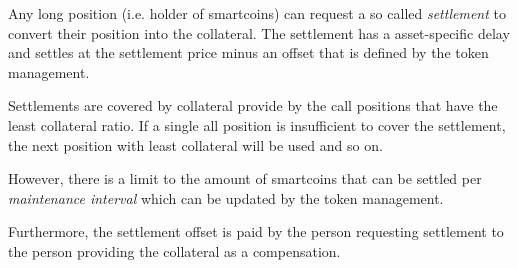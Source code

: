 \label{sec:settlement}

Any long position (i.e. holder of smartcoins) can request a so called
\emph{settlement} to convert their position into the collateral. The settlement
has a asset-specific delay and settles at the settlement price minus an offset
that is defined by the token management.

Settlements are covered by collateral provide by the call positions that have
the least collateral ratio. If a single all position is insufficient to cover
the settlement, the next position with least collateral will be used and so on.

However, there is a limit to the amount of smartcoins that can be settled per
\emph{maintenance interval} which can be updated by the token management.

Furthermore, the settlement offset is paid by the person requesting settlement
to the person providing the collateral as a compensation.


